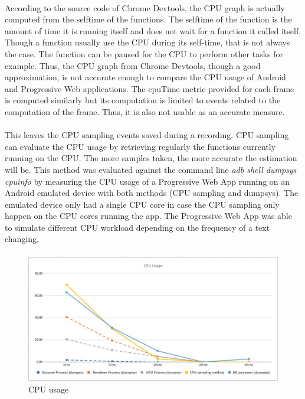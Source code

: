 \documentclass{kththesis}
\begin{document}
\paragraph{}
According to the source code of Chrome Devtools, the CPU graph is actually computed from the selftime of the functions. The selftime of the function is the amount of time it is running itself and does not wait for a function it called itself. Though a function usually use the CPU during its self-time, that is not always the case. The function can be paused for the CPU to perform other tasks for example. Thus, the CPU graph from Chrome Devtools, though a good approximation, is not accurate enough to compare the CPU usage of Android and Progressive Web applications. \newline
The cpuTime metric provided for each frame is computed similarly but its computation is limited to events related to the computation of the frame. Thus, it is also not usable as an accurate measure.

\paragraph{}
This leaves the CPU sampling events saved during a recording. CPU sampling \cite{cpu_sampling} can evaluate the CPU usage by retrieving regularly the functions currently running on the CPU. The more samples taken, the more accurate the estimation will be. This method was evaluated against the command line \textit{adb shell dumpsys cpuinfo} by measuring the CPU usage of a  Progressive Web App running on an Android emulated device with both methods (CPU sampling and dumpsys). The emulated device only had a single CPU core in case the CPU sampling only happen on the CPU cores running the app. The Progressive Web App was able to simulate different CPU workload depending on the frequency of a text changing.
\paragraph{}

\begin{figure}
    \centering
    \includegraphics[width=13cm]{kththesis/Figures/cpu_graph.JPG}
    \caption{CPU usage}
    \label{fig:cpu_usage}
\end{figure}
\end{document}
